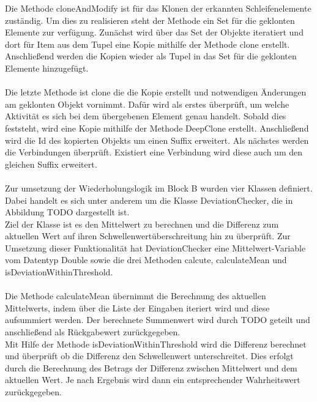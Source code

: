 \documentclass{article}
\begin{document}
    Die Methode cloneAndModify ist für das Klonen der erkannten Schleifenelemente zuständig.
    Um dies zu realisieren steht der Methode ein Set für die geklonten Elemente zur verfügung.
    Zunächst wird über das Set der Objekte iteratiert und dort für Item aus dem Tupel eine Kopie mithilfe der Methode clone erstellt.
    Anschließend werden die Kopien wieder als Tupel in das Set für die geklonten Elemente hinzugefügt.\\
    \\
    Die letzte Methode ist clone die die Kopie erstellt und notwendigen Änderungen am geklonten Objekt vornimmt.
    Dafür wird als erstes überprüft, um welche Aktivität es sich bei dem übergebenen Element genau handelt.
    Sobald dies feststeht, wird eine Kopie mithilfe der Methode DeepClone erstellt.
    Anschließend wird die Id des kopierten Objekts um einen Suffix erweitert.
    Als nächstes werden die Verbindungen überprüft. 
    Existiert eine Verbindung wird diese auch um den gleichen Suffix erweitert.\\
    \\ 
    Zur umsetzung der Wiederholungslogik im Block B wurden vier Klassen definiert.
    Dabei handelt es sich unter anderem um die Klasse DeviationChecker, die in Abbildung TODO dargestellt ist.\\
    Ziel der Klasse ist es den Mittelwert zu berechnen und die Differenz zum aktuellen Wert auf ihren Schwellenwertüberschreitung hin zu überprüft.
    Zur Umsetzung dieser Funktionalität hat DeviationChecker eine Mittelwert-Variable vom Datentyp Double sowie die drei Methoden calcute, calculateMean und isDeviationWithinThreshold.\\
    \\
    Die Methode calculateMean übernimmt die Berechnung des aktuellen Mittelwerts, indem über die Liste der Eingaben iteriert wird und diese aufsummiert werden.
    Der berechnete Summenwert wird durch TODO geteilt und anschließend als Rückgabewert zurückgegeben.\\
    Mit Hilfe der Methode isDeviationWithinThreshold wird die Differenz berechnet und überprüft ob die Differenz den Schwellenwert unterschreitet.
    Dies erfolgt durch die Berechnung des Betrags der Differenz zwischen Mittelwert und dem aktuellen Wert.
    Je nach Ergebnis wird dann ein entsprechender Wahrheitswert zurückgegeben.\\
\end{document}

